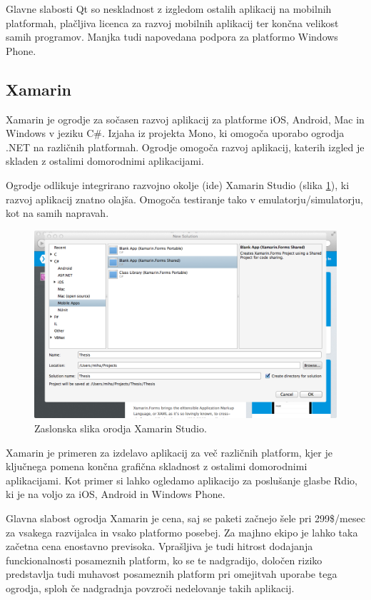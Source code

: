 Glavne slabosti Qt so neskladnost z izgledom ostalih aplikacij na mobilnih platformah, plačljiva licenca za razvoj mobilnih aplikacij ter končna velikost samih programov. Manjka tudi napovedana podpora za platformo Windows Phone.

\subsection{Xamarin}

Xamarin\cite{xamarin} je ogrodje za sočasen razvoj aplikacij za platforme iOS, Android, Mac in Windows v jeziku C\#. Izjaha iz projekta Mono\cite{mono}, ki omogoča uporabo ogrodja .NET\cite{dotnet} na različnih platformah. Ogrodje omogoča razvoj aplikacij, katerih izgled je skladen z ostalimi domorodnimi aplikacijami.

Ogrodje odlikuje integrirano razvojno okolje (\gls{ide}) Xamarin Studio (slika \ref{fig:xamarin}), ki razvoj aplikacij znatno olajša. Omogoča testiranje tako v emulatorju/simulatorju, kot na samih napravah.

\begin{figure}
 \includegraphics[width=\linewidth]{xamarin}
 \caption{Zaslonska slika orodja Xamarin Studio.}
 \label{fig:xamarin}
\end{figure}

Xamarin je primeren za izdelavo aplikacij za več različnih platform, kjer je ključnega pomena končna grafična skladnost z ostalimi domorodnimi aplikacijami. Kot primer si lahko ogledamo aplikacijo za poslušanje glasbe Rdio\cite{rdio}, ki je na voljo za iOS, Android in Windows Phone.

Glavna slabost ogrodja Xamarin je cena, saj se paketi začnejo šele pri 299\$/mesec za vsakega razvijalca in vsako platformo posebej. Za majhno ekipo je lahko taka začetna cena enostavno previsoka. Vprašljiva je tudi hitrost dodajanja funckionalnosti posameznih platform, ko se te nadgradijo, določen riziko predstavlja tudi muhavost posameznih platform pri omejitvah uporabe tega ogrodja, sploh če nadgradnja povzroči nedelovanje takih aplikacij.

